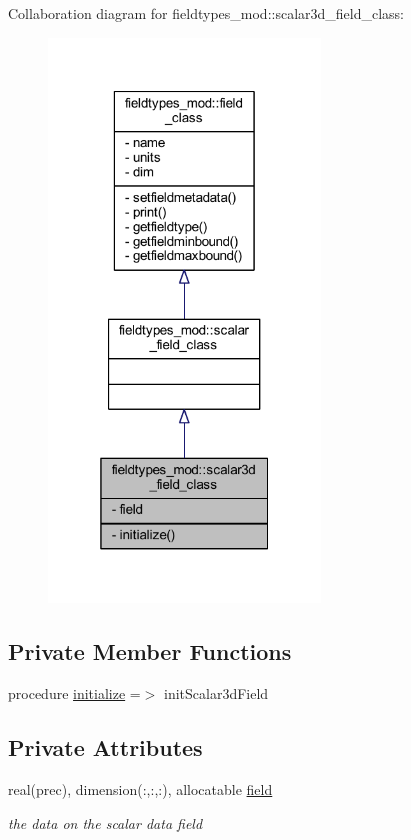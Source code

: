 Collaboration diagram for fieldtypes\+\_\+mod\+:\+:scalar3d\+\_\+field\+\_\+class\+:\nopagebreak
\begin{figure}[H]
\begin{center}
\leavevmode
\includegraphics[width=205pt]{structfieldtypes__mod_1_1scalar3d__field__class__coll__graph}
\end{center}
\end{figure}
\subsection*{Private Member Functions}
\begin{DoxyCompactItemize}
\item 
procedure \mbox{\hyperlink{structfieldtypes__mod_1_1scalar3d__field__class_a17196befda9da8db8f792c933f95a252}{initialize}} =$>$ init\+Scalar3d\+Field
\end{DoxyCompactItemize}
\subsection*{Private Attributes}
\begin{DoxyCompactItemize}
\item 
real(prec), dimension(\+:,\+:,\+:), allocatable \mbox{\hyperlink{structfieldtypes__mod_1_1scalar3d__field__class_a1fc76fc336c07c0189299ae64fee564f}{field}}
\begin{DoxyCompactList}\small\item\em the data on the scalar data field \end{DoxyCompactList}\end{DoxyCompactItemize}


